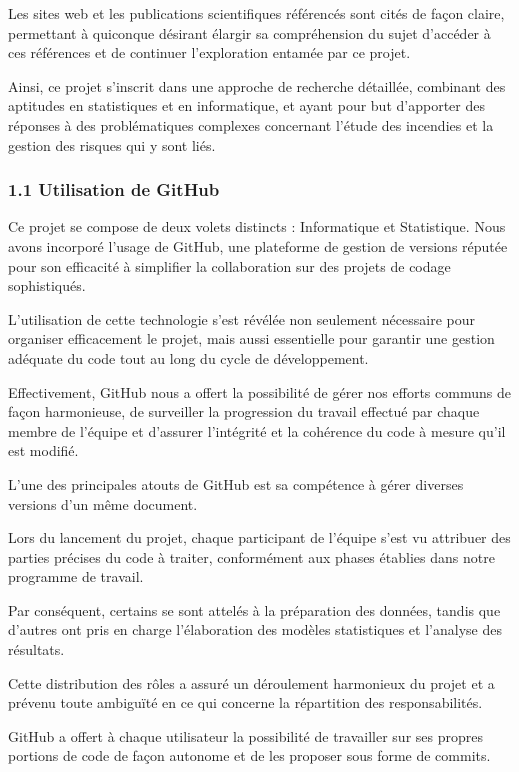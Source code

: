 \documentclass[
]{article}
\begin{document}
Les sites web et les publications scientifiques référencés sont cités de
façon claire, permettant à quiconque désirant élargir sa compréhension
du sujet d'accéder à ces références et de continuer l'exploration
entamée par ce projet.

Ainsi, ce projet s'inscrit dans une approche de recherche détaillée,
combinant des aptitudes en statistiques et en informatique, et ayant
pour but d'apporter des réponses à des problématiques complexes
concernant l'étude des incendies et la gestion des risques qui y sont
liés.

\subsubsection{1.1 Utilisation de GitHub}\label{utilisation-de-github}

Ce projet se compose de deux volets distincts : Informatique et
Statistique. Nous avons incorporé l'usage de GitHub, une plateforme de
gestion de versions réputée pour son efficacité à simplifier la
collaboration sur des projets de codage sophistiqués.

L'utilisation de cette technologie s'est révélée non seulement
nécessaire pour organiser efficacement le projet, mais aussi essentielle
pour garantir une gestion adéquate du code tout au long du cycle de
développement.

Effectivement, GitHub nous a offert la possibilité de gérer nos efforts
communs de façon harmonieuse, de surveiller la progression du travail
effectué par chaque membre de l'équipe et d'assurer l'intégrité et la
cohérence du code à mesure qu'il est modifié.

L'une des principales atouts de GitHub est sa compétence à gérer
diverses versions d'un même document.

Lors du lancement du projet, chaque participant de l'équipe s'est vu
attribuer des parties précises du code à traiter, conformément aux
phases établies dans notre programme de travail.

Par conséquent, certains se sont attelés à la préparation des données,
tandis que d'autres ont pris en charge l'élaboration des modèles
statistiques et l'analyse des résultats.

Cette distribution des rôles a assuré un déroulement harmonieux du
projet et a prévenu toute ambiguïté en ce qui concerne la répartition
des responsabilités.

GitHub a offert à chaque utilisateur la possibilité de travailler sur
ses propres portions de code de façon autonome et de les proposer sous
forme de commits.
\end{document}
